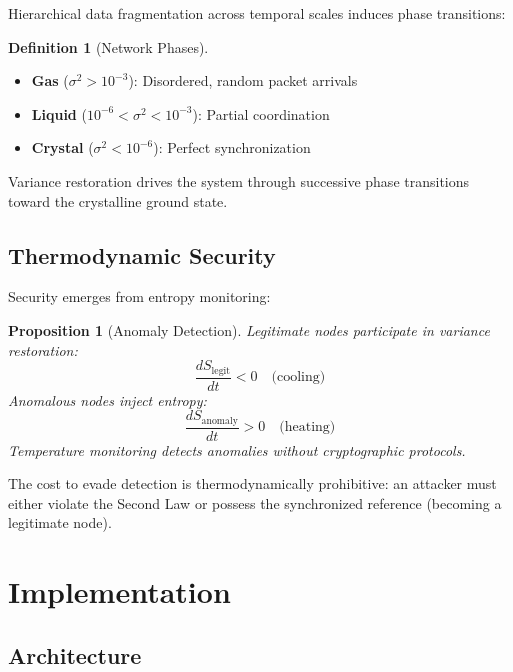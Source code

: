 \documentclass[10pt,twocolumn]{article}
\newtheorem{proposition}[theorem]{Proposition}
\theoremstyle{definition}
\newtheorem{definition}[theorem]{Definition}
\theoremstyle{remark}
\begin{document}
Hierarchical data fragmentation across temporal scales induces phase transitions:

\begin{definition}[Network Phases]
\begin{itemize}[nosep]
\item \textbf{Gas} ($\sigma^2 > 10^{-3}$): Disordered, random packet arrivals
\item \textbf{Liquid} ($10^{-6} < \sigma^2 < 10^{-3}$): Partial coordination
\item \textbf{Crystal} ($\sigma^2 < 10^{-6}$): Perfect synchronization
\end{itemize}
\end{definition}

Variance restoration drives the system through successive phase transitions toward the crystalline ground state.

\subsection{Thermodynamic Security}

Security emerges from entropy monitoring:

\begin{proposition}[Anomaly Detection]
Legitimate nodes participate in variance restoration:
\begin{equation}
\frac{dS_{\text{legit}}}{dt} < 0 \quad \text{(cooling)}
\end{equation}
Anomalous nodes inject entropy:
\begin{equation}
\frac{dS_{\text{anomaly}}}{dt} > 0 \quad \text{(heating)}
\end{equation}
Temperature monitoring detects anomalies without cryptographic protocols.
\end{proposition}

The cost to evade detection is thermodynamically prohibitive: an attacker must either violate the Second Law or possess the synchronized reference (becoming a legitimate node).

\section{Implementation}
\label{sec:implementation}

\subsection{Architecture}
\end{document}
